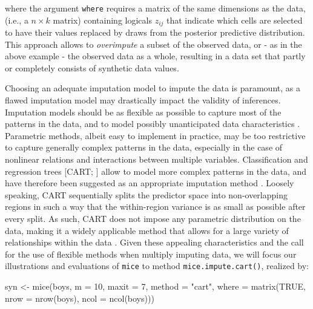 \documentclass[psych,article,submit,moreauthors,pdftex]{mdpi}
\newenvironment{Shaded}{\begin{snugshade}}{\end{snugshade}}
\newcommand{\AttributeTok}[1]{\textcolor[rgb]{0.77,0.63,0.00}{#1}}
\newcommand{\ConstantTok}[1]{\textcolor[rgb]{0.00,0.00,0.00}{#1}}
\newcommand{\DecValTok}[1]{\textcolor[rgb]{0.00,0.00,0.81}{#1}}
\newcommand{\FunctionTok}[1]{\textcolor[rgb]{0.00,0.00,0.00}{#1}}
\newcommand{\NormalTok}[1]{#1}
\newcommand{\OtherTok}[1]{\textcolor[rgb]{0.56,0.35,0.01}{#1}}
\newcommand{\StringTok}[1]{\textcolor[rgb]{0.31,0.60,0.02}{#1}}
\begin{document}
where the argument \texttt{where} requires a matrix of the same
dimensions as the data, (i.e., a \(n \times k\) matrix) containing
logicals \(z_{ij}\) that indicate which cells are selected to have their
values replaced by draws from the posterior predictive distribution.
This approach allows to \emph{overimpute} a subset of the observed data,
or - as in the above example - the observed data as a whole, resulting
in a data set that partly or completely consists of synthetic data
values.

Choosing an adequate imputation model to impute the data is paramount,
as a flawed imputation model may drastically impact the validity of
inferences. Imputation models should be as flexible as possible to
capture most of the patterns in the data, and to model possibly
unanticipated data characteristics
\citep{murray_multiple_2018, rubin_18years_1996}. Parametric methods,
albeit easy to implement in practice, may be too restrictive to capture
generally complex patterns in the data, especially in the case of
nonlinear relations and interactions between multiple variables.
Classification and regression trees {[}CART;
\citet{breiman_cart_1984}{]} allow to model more complex patterns in the
data, and have therefore been suggested as an appropriate imputation
method
\citep{reiter_cart_2005, burgette_reiter_cart_2010, doove_buuren_recursive_2014}.
Loosely speaking, CART sequentially splits the predictor space into
non-overlapping regions in such a way that the within-region variance is
as small as possible after every split. As such, CART does not impose
any parametric distribution on the data, making it a widely applicable
method that allows for a large variety of relationships within the data
\citep{islr_2013}. Given these appealing characteristics and the call
for the use of flexible methods when multiply imputing data, we will
focus our illustrations and evaluations of \texttt{mice} to method
\texttt{mice.impute.cart()}, realized by:

\begin{Shaded}
\begin{Highlighting}[]
\NormalTok{syn }\OtherTok{\textless{}{-}} \FunctionTok{mice}\NormalTok{(boys, }
            \AttributeTok{m =} \DecValTok{10}\NormalTok{,}
            \AttributeTok{maxit =} \DecValTok{7}\NormalTok{, }
            \AttributeTok{method =} \StringTok{"cart"}\NormalTok{,}
            \AttributeTok{where =} \FunctionTok{matrix}\NormalTok{(}\ConstantTok{TRUE}\NormalTok{, }
                           \AttributeTok{nrow =} \FunctionTok{nrow}\NormalTok{(boys),}
                           \AttributeTok{ncol =} \FunctionTok{ncol}\NormalTok{(boys)))}
\end{Highlighting}
\end{Shaded}
\end{document}
